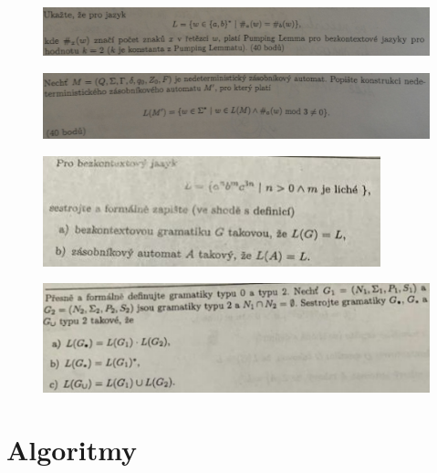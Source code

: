 \documentclass[]{article}
\begin{document}
	\begin{figure}[H]
		\includegraphics[width=\textwidth]{tasks/bezkontextove/task11.png}
	\end{figure}
	
	\begin{figure}[H]
		\includegraphics[width=\textwidth]{tasks/bezkontextove/task12.png}
	\end{figure}
	
	\begin{figure}[H]
		\includegraphics[width=\textwidth]{tasks/bezkontextove/task13.png}
	\end{figure}
	
	\begin{figure}[H]
		\includegraphics[width=\textwidth]{tasks/bezkontextove/task14.png}
	\end{figure}

	\section{Algoritmy}
	
\end{document}
